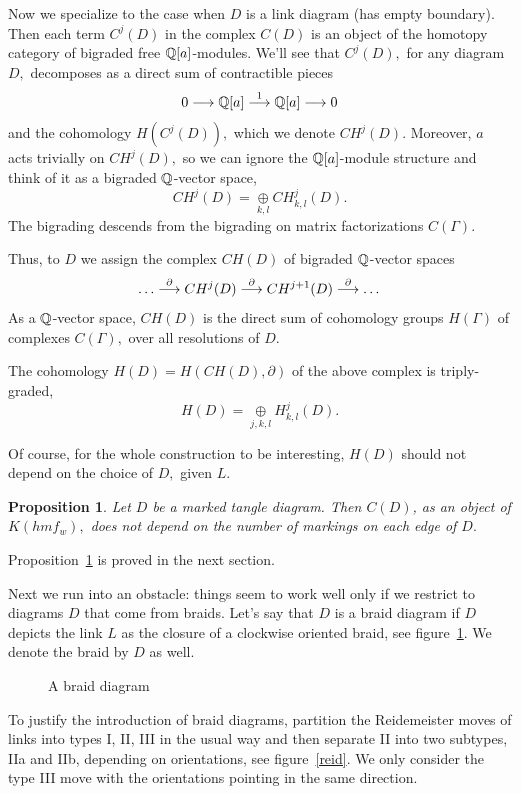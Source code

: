 \documentclass[12pt]{article}
\newtheorem{prop}{Proposition}
\newcommand{\oplusop}[1]{{\mathop{\oplus}\limits_{#1}}}
\begin{document}
\vspace{0.1in} 

Now we specialize to the case when $D$ is a link diagram (has empty boundary). 
Then each term $C^j(D)$ in the complex $C(D)$ is an object of 
the homotopy category of bigraded free $\mathbb Q[a]$-modules.
We'll  see that $C^j(D),$ for any diagram $D,$ decomposes  
as a direct sum of contractible pieces 
$$0 \longrightarrow \mathbb Q[a] \stackrel{1}{\longrightarrow} \mathbb Q[a] \longrightarrow 0 $$ 
and the cohomology $H(C^j(D)),$ which we denote $CH^j(D).$ 
 Moreover, $a$ acts trivially on $CH^j(D),$ so we can 
ignore the $\mathbb Q[a]$-module 
structure and think of it as a bigraded $\mathbb Q$-vector space, 
$$ CH^j(D) = \oplusop{k,l} CH^j_{k,l}(D).$$
The bigrading descends from the bigrading on matrix factorizations 
$C(\Gamma).$ 

Thus, to $D$ we assign the complex $CH(D)$ of bigraded $\mathbb Q$-vector spaces 
$$  \dots \stackrel{\partial}{\longrightarrow}  
  CH^j(D)  \stackrel{\partial}{\longrightarrow} CH^{j+1}(D) \stackrel{\partial}{\longrightarrow} \dots $$
As a $\mathbb Q$-vector space, $CH(D)$ is the direct sum of cohomology groups $H(\Gamma)$ 
of complexes $C(\Gamma),$ over all resolutions of $D.$ 

The cohomology $H(D) = H(CH(D),\partial)$ of the above complex is triply-graded, 
$$H(D) = \oplusop{j,k,l} H^j_{k,l}(D).$$ 

Of course, for the whole construction to be interesting, 
$H(D)$ should not depend on the choice of $D,$ given $L.$ 

\begin{prop}\label{prop-mark} Let $D$ be a marked tangle diagram. 
Then $C(D)$, as an object of $K(hmf_w),$ does not depend 
on the number of markings on each edge of $D.$ 
\end{prop} 

Proposition~\ref{prop-mark} is proved in the next section.

\vspace{0.1in} 

Next we run into an obstacle: things seem to work well only if we 
restrict to diagrams $D$ that come from braids. Let's say that $D$ is 
a braid diagram 
if $D$ depicts the link $L$ as the closure of a clockwise oriented 
braid, see figure~\ref{braid}. We denote the braid by $D$ as well. 

\begin{figure}  \caption{A braid diagram} 
 \label{braid} \end{figure}

To justify the introduction of braid diagrams, partition the  
Reidemeister moves of links into types I, II, III in the usual way and 
then separate II into two subtypes, IIa and IIb, depending on 
orientations, see figure~\ref{reid}. We only consider 
the type III move with the orientations pointing in the same direction.  
\end{document}
